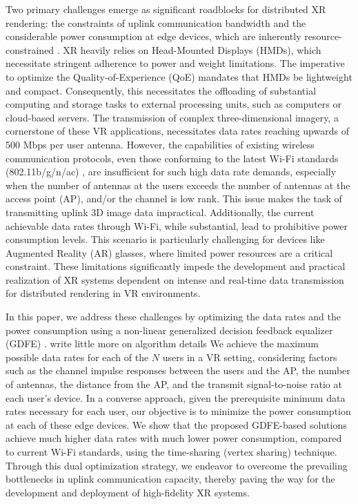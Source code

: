 Two primary challenges emerge as significant roadblocks for distributed XR rendering: the constraints of uplink communication bandwidth \cite{impediment1} and the considerable power consumption at edge devices, which are inherently resource-constrained \cite{impediment2}. XR heavily relies on Head-Mounted Displays (HMDs), which necessitate stringent adherence to power and weight limitations. The imperative to optimize the Quality-of-Experience (QoE) mandates that HMDs be lightweight and compact. Consequently, this necessitates the offloading of substantial computing and storage tasks to external processing units, such as computers or cloud-based servers. The transmission of complex three-dimensional imagery, a cornerstone of these VR applications, necessitates data rates reaching upwards of 500 Mbps per user antenna. However, the capabilities of existing wireless communication protocols, even those conforming to the latest Wi-Fi standards (802.11b/g/n/ac) \cite{wifi1, wifi2}, are insufficient for such high data rate demands, especially when the number of antennas at the users exceeds the number of antennas at the access point (AP), and/or the channel is low rank. This issue makes the task of transmitting uplink 3D image data impractical. Additionally, the current achievable data rates through Wi-Fi, while substantial, lead to prohibitive power consumption levels. This scenario is particularly challenging for devices like Augmented Reality (AR) glasses, where limited power resources are a critical constraint. These limitations significantly impede the development and practical realization of XR systems dependent on intense and real-time data transmission for distributed rendering in VR environments.



In this paper, we address these challenges by optimizing the data rates and the power consumption using a non-linear generalized decision feedback equalizer (GDFE) \cite{gdfe, yunGlobecom}. {\color{red} write little more on algorithm details} We achieve the maximum possible data rates for each of the \( N \) users in a VR setting, considering factors such as the channel impulse responses between the users and the AP, the number of antennas, the distance from the AP, and the transmit signal-to-noise ratio at each user's device. In a converse approach, given the prerequisite minimum data rates necessary for each user, our objective is to minimize the power consumption at each of these edge devices. We show that the proposed GDFE-based solutions achieve much higher data rates with much lower power consumption, compared to current Wi-Fi standards, using the time-sharing (vertex sharing) technique. Through this dual optimization strategy, we endeavor to overcome the prevailing bottlenecks in uplink communication capacity, thereby paving the way for the development and deployment of high-fidelity XR systems.

